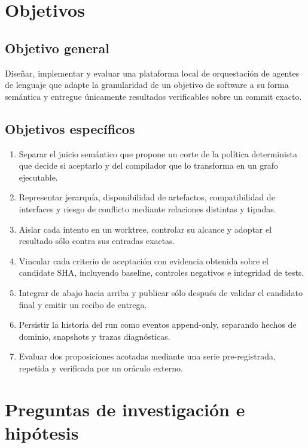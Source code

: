 \section{Objetivos}

\subsection{Objetivo general}

Diseñar, implementar y evaluar una plataforma local de orquestación de agentes
de lenguaje que adapte la granularidad de un objetivo de software a su forma
semántica y entregue únicamente resultados verificables sobre un commit exacto.

\subsection{Objetivos específicos}

\begin{enumerate}
  \item Separar el juicio semántico que propone un corte de la política
  determinista que decide si aceptarlo y del compilador que lo transforma en un
  grafo ejecutable.
  \item Representar jerarquía, disponibilidad de artefactos, compatibilidad de
  interfaces y riesgo de conflicto mediante relaciones distintas y tipadas.
  \item Aislar cada intento en un worktree, controlar su alcance y adoptar el
  resultado sólo contra sus entradas exactas.
  \item Vincular cada criterio de aceptación con evidencia obtenida sobre el
  candidate SHA, incluyendo baseline, controles negativos e integridad de
  tests.
  \item Integrar de abajo hacia arriba y publicar sólo después de validar el
  candidato final y emitir un recibo de entrega.
  \item Persistir la historia del run como eventos append-only, separando hechos
  de dominio, snapshots y trazas diagnósticas.
  \item Evaluar dos proposiciones acotadas mediante una serie pre-registrada,
  repetida y verificada por un oráculo externo.
\end{enumerate}

\section{Preguntas de investigación e hipótesis}

